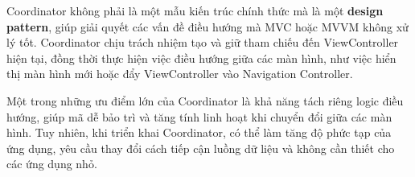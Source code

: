 \hspace*{0.8cm}Coordinator không phải là một mẫu kiến trúc chính thức mà là một \textbf{design pattern}, giúp giải quyết các vấn đề điều hướng mà MVC hoặc MVVM không xử lý tốt. Coordinator chịu trách nhiệm tạo và giữ tham chiếu đến ViewController hiện tại, đồng thời thực hiện việc điều hướng giữa các màn hình, như việc hiển thị màn hình mới hoặc đẩy ViewController vào Navigation Controller.

  Một trong những ưu điểm lớn của Coordinator là khả năng tách riêng logic điều hướng, giúp mã dễ bảo trì và tăng tính linh hoạt khi chuyển đổi giữa các màn hình. Tuy nhiên, khi triển khai Coordinator, có thể làm tăng độ phức tạp của ứng dụng, yêu cầu thay đổi cách tiếp cận luồng dữ liệu và không cần thiết cho các ứng dụng nhỏ.